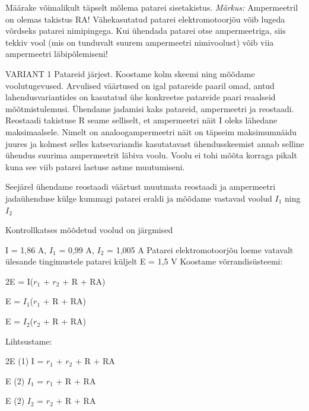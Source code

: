 
Määrake võimalikult täpselt mõlema patarei sisetakistus.
\textit{Märkus:} Ampermeetril on olemas takistus RA! Vähekasutatud patarei elektromotoorjõu võib lugeda võrdseks patarei nimipingega. Kui ühendada patarei otse ampermeetriga, siis tekkiv vool (mis on tunduvalt suurem ampermeetri nimivoolust) võib viia ampermeetri läbipõlemiseni!

\hint

\solu
VARIANT 1 Patareid järjest. Koostame kolm skeemi ning mõõdame voolutugevused. Arvulised väärtused on igal patareide paaril omad, antud lahendusvariantides on kasutatud ühe konkreetse patareide paari reaalseid mõõtmistulemusi. Ühendame jadamisi kaks patareid, ampermeetri ja reostaadi. Reostaadi takistuse R seame selliselt, et ampermeetri näit I oleks lähedane maksimaalsele. Nimelt on analoogampermeetri näit on täpseim maksimumnäidu juures ja kolmest selles katsevariandis kasutatavast ühendusskeemist annab selline ühendus suurima ampermeetrit läbiva voolu. Voolu ei tohi mõõta korraga pikalt kuna see viib patarei laetuse astme muutumiseni.

Seejärel ühendame reostaadi väärtust muutmata reostaadi ja ampermeetri jadaühenduse külge kummagi patarei eraldi ja mõõdame vastavad voolud $I_1$ ning $I_2$

Kontrollkatses mõõdetud voolud on järgmised

I = 1,86 A, $I_1$ = 0,99 A, $I_2$ = 1,005 A Patarei elektromotoorjõu loeme vatavalt ülesande tingimustele patarei küljelt E = 1,5 V Koostame võrrandisüsteemi:

2E = I($r_1$ + $r_2$ + R + RA)

E = $I_1$($r_1$ + R + RA)

E = $I_2$($r_2$ + R + RA)

Lihtsustame:

2E (1) I = $r_1$ + $r_2$ + R + RA

E (2) $I_1$ = $r_1$ + R + RA

E (2) $I_2$ = $r_2$ + R + RA

